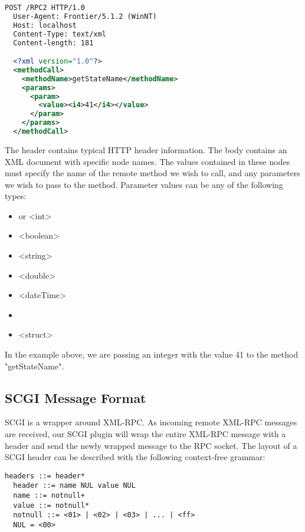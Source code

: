 \vspace{20px}
\begin{lstlisting}[caption=A basic XML-RPC request, language=XML]
  POST /RPC2 HTTP/1.0
  User-Agent: Frontier/5.1.2 (WinNT)
  Host: localhost
  Content-Type: text/xml
  Content-length: 181

  <?xml version="1.0"?>
  <methodCall>
    <methodName>getStateName</methodName>
    <params>
      <param>
        <value><i4>41</i4></value>
      </param>
    </params>
  </methodCall>
\end{lstlisting}

The header contains typical HTTP header information. The body contains an XML document with specific node names. The values contained in these nodes must specify the name of the remote method we wish to call, and any parameters we wish to pass to the method. Parameter values can be any of the following types:

\begin{itemize}
	\item <i4> or <int>
	\item <boolean>
	\item <string>
	\item <double>
	\item <dateTime>
	\item <base64>
	\item <struct>
\end{itemize}

In the example above, we are passing an integer with the value 41 to the method "getStateName".

\subsection{SCGI Message Format}
SCGI is a wrapper around XML-RPC. As incoming remote XML-RPC messages are received, our SCGI plugin will wrap the entire XML-RPC message with a header and send the newly wrapped message to the RPC socket. The layout of a SCGI header can be described with the following context-free grammar\cite{SCGI}:

\vspace{20px}
\begin{lstlisting}[caption=Layout of a SCGI header]
  headers ::= header*
  header ::= name NUL value NUL
  name ::= notnull+                
  value ::= notnull*
  notnull ::= <01> | <02> | <03> | ... | <ff>
  NUL = <00>
\end{lstlisting}

